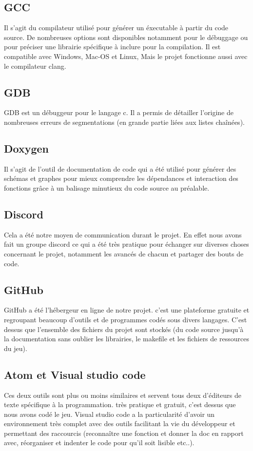 \documentclass[a4paper,11pt]{article}
\begin{document}
\subsection{GCC}
Il s'agit du compilateur utilisé pour générer un éxecutable à partir du code source. De nombreuses options sont disponibles notamment pour le débuggage ou pour préciser une librairie spécifique à inclure pour la compilation. Il est compatible avec Windows, Mac-OS et Linux, Mais le projet fonctionne aussi avec le compilateur clang.
\subsection{GDB}
GDB est un débuggeur pour le langage c. Il a permis de détailler l'origine de nombreuses erreurs de segmentations (en grande partie liées aux listes chaînées).\\
\subsection{Doxygen}
Il s'agit de l'outil de documentation de code qui a été utilisé pour générer des schémas et graphes pour mieux comprendre les dépendances et interaction des fonctions grâce à un balisage minutieux du code source au préalable. \\
\subsection{Discord}
Cela a été notre moyen de communication durant le projet. En effet nous avons fait un groupe discord ce qui a été très pratique pour échanger sur diverses choses concernant le projet, notamment les avancés de chacun et partager des bouts de code.\\
\subsection{GitHub}
GitHub a été l'hébergeur en ligne de notre projet. c'est une plateforme gratuite et regroupant beaucoup d'outils et de programmes codés sous divers langages.
C'est dessus que l'ensemble des fichiers du projet sont stockés (du code source jusqu'à la documentation sans oublier les librairies, le makefile et les fichiers de ressources du jeu).\\
\subsection{Atom et Visual studio code}
Ces deux outils sont plus ou moins similaires et servent tous deux d'éditeurs de texte spécifique à la programmation. très pratique et gratuit, c'est dessus que nous avons codé le jeu.
Visual studio code a la particularité d'avoir un environnement très complet avec des outils facilitant la vie du développeur et permettant des raccourcis (reconnaître une fonction et donner la doc en rapport avec, réorganiser et indenter le code pour qu'il soit lisible etc..).\\
\end{document}

